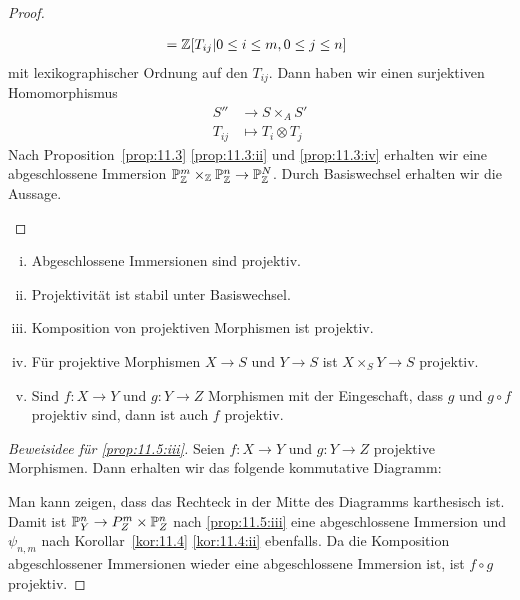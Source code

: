 \begin{kor}
\begin{proof}
\begin{enumerate}[i)]
\begin{align*}
				&\phantom{:}= \Z[T_{ij} | 0 \leq i \leq m, 0 \leq j \leq n ]
			\end{align*}
			mit lexikographischer Ordnung auf den $T_{ij}$. Dann haben wir einen surjektiven Homomorphismus
			\begin{align*}
				S'' &\to S \times_A S'\\
				T_{ij} & \mapsto T_i \otimes T_j
			\end{align*}
			Nach Proposition~\ref{prop:11.3} \ref{prop:11.3:ii} und \ref{prop:11.3:iv} erhalten wir eine abgeschlossene Immersion $\P_\Z^m \times_\Z \P_\Z^n \to \P_\Z^N$. Durch Basiswechsel erhalten wir die Aussage.
		\end{enumerate}
	\end{proof}
\end{kor}

\begin{prop}
	\label{prop:11.5}
	\begin{enumerate}[i)]
	\item\label{prop:11.5:i} Abgeschlossene Immersionen sind projektiv.
	\item\label{prop:11.5:ii} Projektivität ist stabil unter Basiswechsel.
	\item\label{prop:11.5:iii} Komposition von projektiven Morphismen ist projektiv.
	\item\label{prop:11.5:iv} Für projektive Morphismen $X\to S$ und $Y \to S$ ist $X \times_S Y \to S$ projektiv.
	\item\label{prop:11.5:v} Sind $f \colon X \to Y$ und $g \colon Y \to Z$ Morphismen mit der Eingeschaft, dass $g$ und $g \circ f$ projektiv sind, dann ist auch $f$ projektiv.
	\end{enumerate}
	\begin{proof}[Beweisidee für \ref{prop:11.5:iii}] Seien $f \colon X \to Y$ und $g \colon Y \to Z$ projektive Morphismen. Dann erhalten wir das folgende kommutative Diagramm:
		\begin{center}
		\end{center}
		Man kann zeigen, dass das Rechteck in der Mitte des Diagramms karthesisch ist. Damit ist $\P_Y^n \to P_Z^m \times \P_Z^n$ nach \ref{prop:11.5:iii} eine abgeschlossene Immersion und $\psi_{n,m}$ nach Korollar~\ref{kor:11.4} \ref{kor:11.4:ii} ebenfalls. Da die Komposition abgeschlossener Immersionen wieder eine abgeschlossene Immersion ist, ist $f \circ g$ projektiv.
	\end{proof}
\end{prop}


